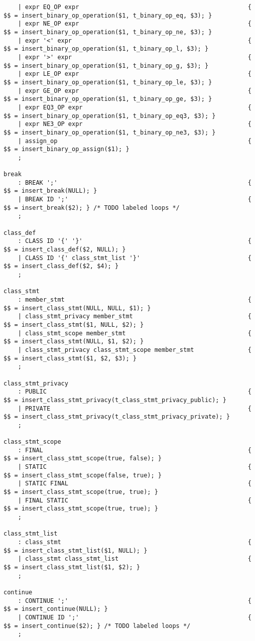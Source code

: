 \documentclass[a4paper]{article}
\begin{document}
\begin{verbatim}
	| expr EQ_OP expr												{ $$ = insert_binary_op_operation($1, t_binary_op_eq, $3); }
	| expr NE_OP expr												{ $$ = insert_binary_op_operation($1, t_binary_op_ne, $3); }
	| expr '<' expr													{ $$ = insert_binary_op_operation($1, t_binary_op_l, $3); }
	| expr '>' expr													{ $$ = insert_binary_op_operation($1, t_binary_op_g, $3); }
	| expr LE_OP expr												{ $$ = insert_binary_op_operation($1, t_binary_op_le, $3); }
	| expr GE_OP expr												{ $$ = insert_binary_op_operation($1, t_binary_op_ge, $3); }
	| expr EQ3_OP expr												{ $$ = insert_binary_op_operation($1, t_binary_op_eq3, $3); }
	| expr NE3_OP expr												{ $$ = insert_binary_op_operation($1, t_binary_op_ne3, $3); }
	| assign_op														{ $$ = insert_binary_op_assign($1); }
	;

break
	: BREAK ';'														{ $$ = insert_break(NULL); }
	| BREAK ID ';'													{ $$ = insert_break($2); } /* TODO labeled loops */
	;

class_def
	: CLASS ID '{' '}'												{ $$ = insert_class_def($2, NULL); }
	| CLASS ID '{' class_stmt_list '}'								{ $$ = insert_class_def($2, $4); }
	;

class_stmt
	: member_stmt													{ $$ = insert_class_stmt(NULL, NULL, $1); }
	| class_stmt_privacy member_stmt								{ $$ = insert_class_stmt($1, NULL, $2); }
	| class_stmt_scope member_stmt									{ $$ = insert_class_stmt(NULL, $1, $2); }
	| class_stmt_privacy class_stmt_scope member_stmt				{ $$ = insert_class_stmt($1, $2, $3); }
	;

class_stmt_privacy
	: PUBLIC														{ $$ = insert_class_stmt_privacy(t_class_stmt_privacy_public); }
	| PRIVATE														{ $$ = insert_class_stmt_privacy(t_class_stmt_privacy_private); }
	;

class_stmt_scope
	: FINAL															{ $$ = insert_class_stmt_scope(true, false); }
	| STATIC														{ $$ = insert_class_stmt_scope(false, true); }
	| STATIC FINAL													{ $$ = insert_class_stmt_scope(true, true); } 
	| FINAL STATIC													{ $$ = insert_class_stmt_scope(true, true); }
	;

class_stmt_list
	: class_stmt													{ $$ = insert_class_stmt_list($1, NULL); }
	| class_stmt class_stmt_list									{ $$ = insert_class_stmt_list($1, $2); }
	;

continue
	: CONTINUE ';'													{ $$ = insert_continue(NULL); }
	| CONTINUE ID ';'												{ $$ = insert_continue($2); } /* TODO labeled loops */
	;


\end{verbatim}
\end{document}
